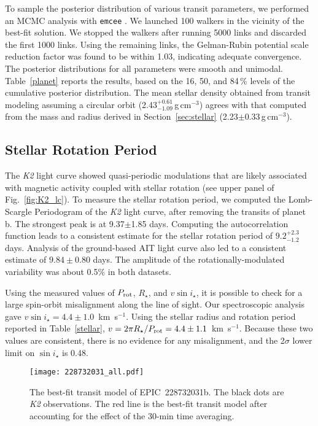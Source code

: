 \documentclass[twocolumn]{aastex61}
\begin{document}
To sample the posterior distribution of various transit parameters, we performed an MCMC analysis with {\tt emcee} \citep{emcee}.  We launched 100 walkers in the vicinity of the best-fit solution. We stopped the walkers after running 5000 links and discarded the first 1000 links. Using the remaining links, the Gelman-Rubin potential scale reduction factor was found to be within 1.03, indicating adequate convergence. The posterior distributions for all parameters were smooth and unimodal. Table~\ref{planet} reports the results,
based on the 16, 50, and 84\,\% levels of the cumulative posterior distribution.
The mean stellar density obtained from transit modeling assuming a circular orbit (2.43$^{+0.61}_{-1.09}$\,g\,cm$^{-3}$) agrees with that computed from the mass and radius derived in Section~\ref{sec:stellar} (2.23$ \pm 0.33$\,g\,cm$^{-3}$).


\subsection{Stellar Rotation Period}

The {\it K2} light curve showed quasi-periodic modulations that are likely associated with magnetic activity coupled with stellar rotation (see upper panel of Fig.~\ref{fig:K2_lc}). To measure the stellar rotation period, we computed the Lomb-Scargle Periodogram \citep{Lomb1976,Scargle1982} of the {\it K2} light curve, after removing the transits of planet b. The strongest peak is at 9.37$\pm$1.85 days.  Computing the autocorrelation function \citep{McQuillan2014} leads to a consistent estimate for the stellar rotation period of $9.2^{+2.3}_{-1.2}$ days. Analysis of the ground-based AIT light curve also led to a
consistent estimate of $9.84 \pm 0.80$ days. The amplitude of the rotationally-modulated variability was about 0.5\% in both datasets.

Using the measured values of $P_{\rm rot}$, $R_\star$, and $v\sin i_\star$, it is possible to check for a large spin-orbit misalignment along the line of sight. Our spectroscopic analysis gave $v\sin i_\star = 4.4 \pm 1.0$~km~s$^{-1}$.
Using the stellar radius and rotation period reported in Table~\ref{stellar},
$v = 2\pi R_\star / P_{\rm rot} = 4.4 \pm 1.1$~km~s$^{-1}$.
Because these two values are consistent, there is no evidence for any misalignment,
and the 2$\sigma$ lower limit on $\sin i_\star$ is 0.48.




\begin{figure}
\begin{center}
\texttt{[image: 228732031\_all.pdf]}
\caption{The best-fit transit model of EPIC~228732031b. The black dots are {\it K2} observations. The red line is the best-fit transit model after accounting for the effect of the 30-min time averaging.}
\label{transit}
\end{center}
\end{figure}
\end{document}
